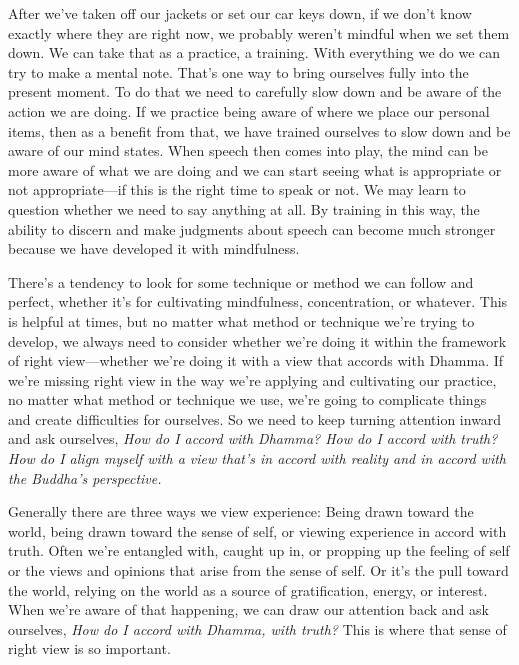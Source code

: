 After we've taken off our jackets or set our car keys down, if we don't 
know exactly where they are right now, we probably weren't mindful when 
we set them down. We can take that as a practice, a training. With 
everything we do we can try to make a mental note. That's one way to 
bring ourselves fully into the present moment. To do that we need to 
carefully slow down and be aware of the action we are doing. If we 
practice being aware of where we place our personal items, then as a 
benefit from that, we have trained ourselves to slow down and be aware 
of our mind states. When speech then comes into play, the mind can be 
more aware of what we are doing and we can start seeing what is 
appropriate or not appropriate---if this is the right time to speak or 
not. We may learn to question whether we need to say anything at all. 
By training in this way, the ability to discern and make judgments 
about speech can become much stronger because we have developed it with 
mindfulness.


There's a tendency to look for some technique or method we can follow 
and perfect, whether it's for cultivating mindfulness, concentration, 
or whatever. This is helpful at times, but no matter what method or 
technique we're trying to develop, we always need to consider whether 
we're doing it within the framework of right view---whether we're doing 
it with a view that accords with Dhamma. If we're missing right view in 
the way we're applying and cultivating our practice, no matter what 
method or technique we use, we're going to complicate things and create 
difficulties for ourselves. So we need to keep turning attention inward 
and ask ourselves, \emph{How do I accord with Dhamma? How do I accord 
with truth? How do I align myself with a view that's in accord with 
reality and in accord with the Buddha's perspective.}

Generally there are three ways we view experience: Being drawn toward 
the world, being drawn toward the sense of self, or viewing experience 
in accord with truth. Often we're entangled with, caught up in, or 
propping up the feeling of self or the views and opinions that arise 
from the sense of self. Or it's the pull toward the world, relying on 
the world as a source of gratification, energy, or interest. When we're 
aware of that happening, we can draw our attention back and ask 
ourselves, \emph{How do I accord with Dhamma, with truth?} This is 
where that sense of right view is so important.

